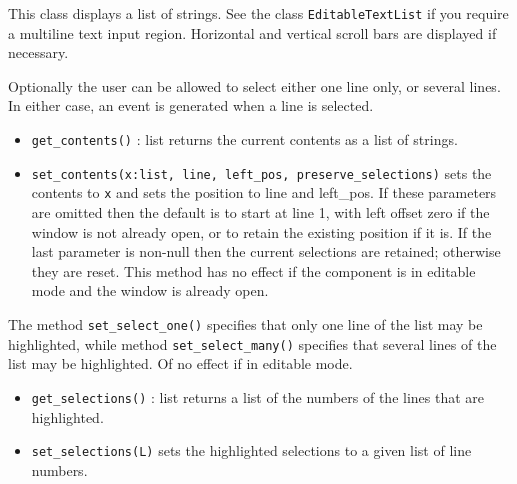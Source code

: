 \medskip{}

This class displays a list of strings. See the class  \texttt{EditableTextList}
if you require a multiline text input region. Horizontal and
vertical scroll bars are displayed if necessary.

Optionally the user can be allowed to
select either one line only, or several lines. In either case, an
event is generated when a line is selected.

\begin{itemize}
\item\noindent\texttt{get\_contents()} : list returns the current contents as a list of
strings.

\item\noindent\texttt{set\_contents(x:list, line, left\_pos, preserve\_selections)} sets the
contents to \texttt{x} and sets the position to line and left\_pos. If
these parameters are omitted then the default is to start at line 1,
with left offset zero if the window is not already open, or to retain
the existing position if it is. If the last parameter is non-null then
the current selections are retained; otherwise they are reset. This
method has no effect if the component is in editable mode and the
window is already open.

\end{itemize}

The method \texttt{set\_select\_one()} specifies that only one line of the list
may be highlighted, while method \texttt{set\_select\_many()} specifies that
several lines of the list may be highlighted. Of no effect if in editable mode.

\begin{itemize}
\item\noindent\texttt{get\_selections()} : list returns a list of the numbers of the lines
that are highlighted.

\item\noindent\texttt{set\_selections(L)} sets the highlighted selections to a
given list of line numbers.

\end{itemize}

